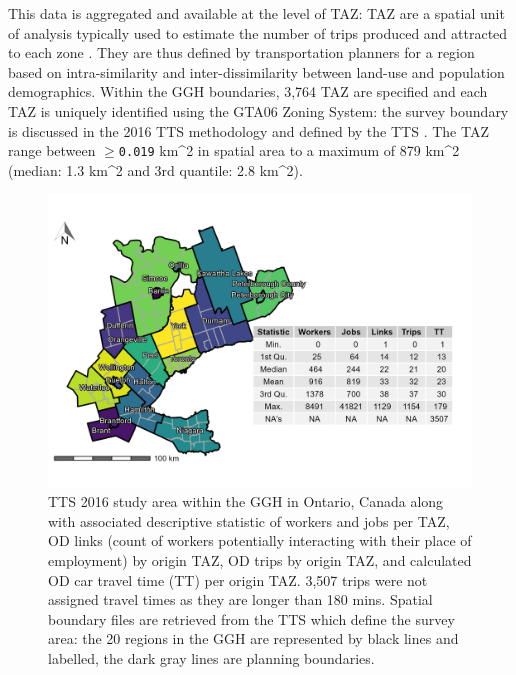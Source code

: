 \documentclass[Royal,times,sageh]{sagej}
\begin{document}
This data is aggregated and available at the level of TAZ: TAZ are a
spatial unit of analysis typically used to estimate the number of trips
produced and attracted to each zone \citep{meyer_urban_2001}. They are
thus defined by transportation planners for a region based on
intra-similarity and inter-dissimilarity between land-use and population
demographics. Within the GGH boundaries, 3,764 TAZ are specified and
each TAZ is uniquely identified using the GTA06 Zoning System: the
survey boundary is discussed in the 2016 TTS methodology and defined by
the TTS \citep{data_management_group_tts_2018}. The TAZ range between
\(\ge\)\texttt{0.019} km\^{}2 in spatial area to a maximum of 879
km\^{}2 (median: 1.3 km\^{}2 and 3rd quantile: 2.8 km\^{}2).

\begin{figure}[H]

{\centering \includegraphics[width=1\linewidth]{images/TTS16-survey-area} 

}

\caption{\label{fig:TTS-16-survey-area}TTS 2016 study area within the GGH in Ontario, Canada along with associated descriptive statistic of workers and jobs per TAZ, OD links (count of workers potentially interacting with their place of employment) by origin TAZ, OD trips by origin TAZ, and calculated OD car travel time (TT) per origin TAZ. 3,507 trips were not assigned travel times as they are longer than 180 mins. Spatial boundary files are retrieved from the TTS which define the survey area: the 20 regions in the GGH are represented by black lines and labelled, the dark gray lines are planning boundaries.}\label{fig:TTS-16-survey-area}
\end{figure}
\end{document}
